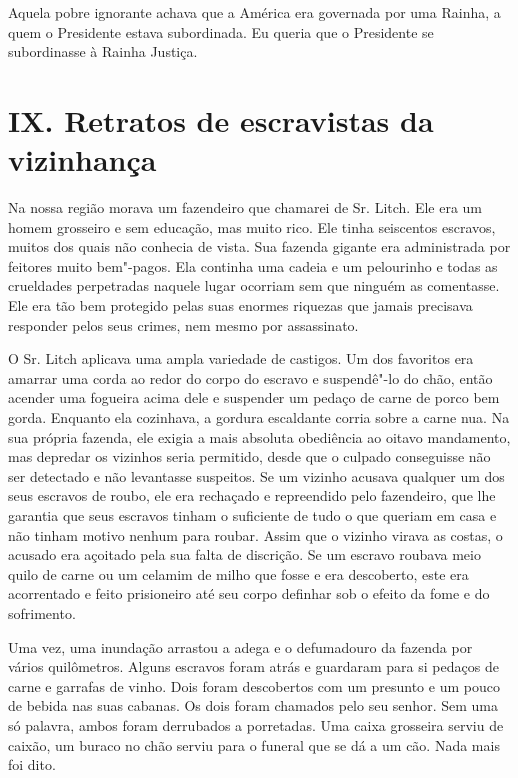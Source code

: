 Aquela pobre ignorante achava que a
América era governada por uma Rainha, a quem o Presidente estava
subordinada. Eu queria que o Presidente se subordinasse à Rainha
Justiça.

\chapter{IX. Retratos de escravistas da
vizinhança}

Na nossa região morava um fazendeiro
que chamarei de Sr. Litch. Ele era um homem grosseiro e sem educação,
mas muito rico. Ele tinha seiscentos escravos, muitos dos quais não
conhecia de vista. Sua fazenda gigante era administrada por feitores
muito bem"-pagos. Ela continha uma cadeia e um pelourinho e todas as
crueldades perpetradas naquele lugar ocorriam sem que ninguém as
comentasse. Ele era tão bem protegido pelas suas enormes riquezas que
jamais precisava responder pelos seus crimes, nem mesmo por assassinato.

O Sr. Litch aplicava uma ampla
variedade de castigos. Um dos favoritos era amarrar uma corda ao redor
do corpo do escravo e suspendê"-lo do chão, então acender uma fogueira
acima dele e suspender um pedaço de carne de porco bem gorda. Enquanto
ela cozinhava, a gordura escaldante corria sobre a carne nua. Na sua
própria fazenda, ele exigia a mais absoluta obediência ao oitavo
mandamento, mas depredar os vizinhos seria permitido, desde que o
culpado conseguisse não ser detectado e não levantasse suspeitos. Se um
vizinho acusava qualquer um dos seus escravos de roubo, ele era
rechaçado e repreendido pelo fazendeiro, que lhe garantia que seus
escravos tinham o suficiente de tudo o que queriam em casa e não tinham
motivo nenhum para roubar. Assim que o vizinho virava as costas, o
acusado era açoitado pela sua falta de discrição. Se um escravo roubava
meio quilo de carne ou um celamim de milho que fosse e era descoberto,
este era acorrentado e feito prisioneiro até seu corpo definhar sob o
efeito da fome e do sofrimento.

Uma vez, uma inundação arrastou a adega
e o defumadouro da fazenda por vários quilômetros. Alguns escravos foram
atrás e guardaram para si pedaços de carne e garrafas de vinho. Dois
foram descobertos com um presunto e um pouco de bebida nas suas cabanas.
Os dois foram chamados pelo seu senhor. Sem uma só palavra, ambos foram
derrubados a porretadas. Uma caixa grosseira serviu de caixão, um buraco
no chão serviu para o funeral que se dá a um cão. Nada mais foi dito.

